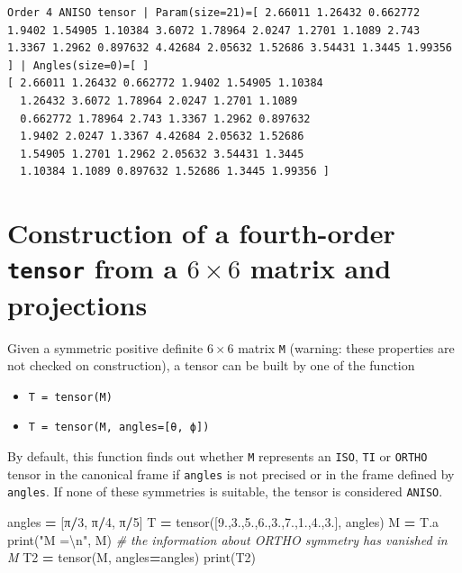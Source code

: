 \documentclass[
  a4paper,
  numbers=noendperiod,
  DIV=12]{scrreprt}
\newenvironment{Shaded}{\begin{snugshade}}{\end{snugshade}}
\newcommand{\BuiltInTok}[1]{#1}
\newcommand{\CharTok}[1]{\textcolor[rgb]{0.31,0.60,0.02}{#1}}
\newcommand{\CommentTok}[1]{\textcolor[rgb]{0.56,0.35,0.01}{\textit{#1}}}
\newcommand{\DecValTok}[1]{\textcolor[rgb]{0.00,0.00,0.81}{#1}}
\newcommand{\FloatTok}[1]{\textcolor[rgb]{0.00,0.00,0.81}{#1}}
\newcommand{\NormalTok}[1]{#1}
\newcommand{\OperatorTok}[1]{\textcolor[rgb]{0.81,0.36,0.00}{\textbf{#1}}}
\newcommand{\StringTok}[1]{\textcolor[rgb]{0.31,0.60,0.02}{#1}}
\newcounter{none} %
\providecommand{\tightlist}{%
  \setlength{\itemsep}{0pt}\setlength{\parskip}{0pt}}
\begin{document}
\begin{verbatim}
Order 4 ANISO tensor | Param(size=21)=[ 2.66011 1.26432 0.662772 1.9402 1.54905 1.10384 3.6072 1.78964 2.0247 1.2701 1.1089 2.743 1.3367 1.2962 0.897632 4.42684 2.05632 1.52686 3.54431 1.3445 1.99356 ] | Angles(size=0)=[ ]
[ 2.66011 1.26432 0.662772 1.9402 1.54905 1.10384 
  1.26432 3.6072 1.78964 2.0247 1.2701 1.1089 
  0.662772 1.78964 2.743 1.3367 1.2962 0.897632 
  1.9402 2.0247 1.3367 4.42684 2.05632 1.52686 
  1.54905 1.2701 1.2962 2.05632 3.54431 1.3445 
  1.10384 1.1089 0.897632 1.52686 1.3445 1.99356 ]
\end{verbatim}

\section{\texorpdfstring{Construction of a fourth-order \texttt{tensor}
from a \(6×6\) matrix and
projections}{Construction of a fourth-order tensor from a 6×6 matrix and projections}}\label{construction-of-a-fourth-order-tensor-from-a-66-matrix-and-projections}

Given a symmetric positive definite \(6×6\) matrix \texttt{M} (warning:
these properties are not checked on construction), a tensor can be built
by one of the function

\begin{itemize}
\tightlist
\item
  \texttt{T\ =\ tensor(M)}
\item
  \texttt{T\ =\ tensor(M,\ angles={[}θ,\ ϕ{]})}
\end{itemize}

By default, this function finds out whether \texttt{M} represents an
\texttt{ISO}, \texttt{TI} or \texttt{ORTHO} tensor in the canonical
frame if \texttt{angles} is not precised or in the frame defined by
\texttt{angles}. If none of these symmetries is suitable, the tensor is
considered \texttt{ANISO}.

\begin{Shaded}
\begin{Highlighting}[]
\NormalTok{angles }\OperatorTok{=}\NormalTok{ [π}\OperatorTok{/}\DecValTok{3}\NormalTok{, π}\OperatorTok{/}\DecValTok{4}\NormalTok{, π}\OperatorTok{/}\DecValTok{5}\NormalTok{]}
\NormalTok{T }\OperatorTok{=}\NormalTok{ tensor([}\FloatTok{9.}\NormalTok{,}\FloatTok{3.}\NormalTok{,}\FloatTok{5.}\NormalTok{,}\FloatTok{6.}\NormalTok{,}\FloatTok{3.}\NormalTok{,}\FloatTok{7.}\NormalTok{,}\FloatTok{1.}\NormalTok{,}\FloatTok{4.}\NormalTok{,}\FloatTok{3.}\NormalTok{], angles)}
\NormalTok{M }\OperatorTok{=}\NormalTok{ T.a}
\BuiltInTok{print}\NormalTok{(}\StringTok{"M =}\CharTok{\textbackslash{}n}\StringTok{"}\NormalTok{, M) }\CommentTok{\# the information about ORTHO symmetry has vanished in M}
\NormalTok{T2 }\OperatorTok{=}\NormalTok{ tensor(M, angles}\OperatorTok{=}\NormalTok{angles)}
\BuiltInTok{print}\NormalTok{(T2)}
\end{Highlighting}
\end{Shaded}
\end{document}
